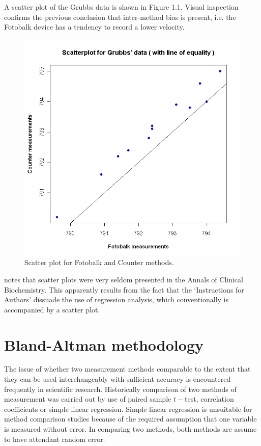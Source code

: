 \documentclass[Main.tex]{subfiles}
\begin{document}
	
	A scatter plot of the Grubbs data is shown in Figure 1.1. Visual inspection confirms the previous conclusion that inter-method bias is present, i.e. the Fotobalk device has a tendency to record a lower velocity.
	
	\begin{figure}[h!]
		\begin{center}
			\includegraphics[width=125mm]{images/GrubbsScatter.jpeg}
			\caption{Scatter plot for Fotobalk and Counter methods.}\label{GrubbsScatter}
		\end{center}
	\end{figure}
	
	\citet{Dewitte} notes that scatter plots were very seldom
	presented in the Annals of Clinical Biochemistry. This apparently
	results from the fact that the `Instructions for Authors' dissuade
	the use of regression analysis, which conventionally is
	accompanied by a scatter plot.
	
	\newpage





\section{Bland-Altman methodology}
The issue of whether two measurement methods comparable to the extent that they can be used interchangeably with sufficient
accuracy is encountered frequently in scientific research. Historically comparison of two methods of measurement was carried out by use of paired sample $t-$test, correlation coefficients or simple linear regression. Simple linear regression is unsuitable for method comparison studies because of the required assumption that one variable is measured without error. In comparing two methods, both methods are assume to have attendant random error.
	
\end{document}
